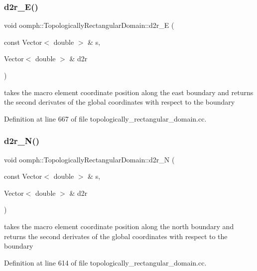 \subsubsection{\texorpdfstring{d2r\+\_\+\+E()}{d2r\_E()}}
{\footnotesize\ttfamily void oomph\+::\+Topologically\+Rectangular\+Domain\+::d2r\+\_\+E (\begin{DoxyParamCaption}\item[{const Vector$<$ double $>$ \&}]{s,  }\item[{Vector$<$ double $>$ \&}]{d2r }\end{DoxyParamCaption})\hspace{0.3cm}{\ttfamily [private]}}



takes the macro element coordinate position along the east boundary and returns the second derivates of the global coordinates with respect to the boundary 



Definition at line 667 of file topologically\+\_\+rectangular\+\_\+domain.\+cc.

\mbox{\label{classoomph_1_1TopologicallyRectangularDomain_a6cc86191b0085c8d7b3f05985cf647c8}} 
\subsubsection{\texorpdfstring{d2r\+\_\+\+N()}{d2r\_N()}}
{\footnotesize\ttfamily void oomph\+::\+Topologically\+Rectangular\+Domain\+::d2r\+\_\+N (\begin{DoxyParamCaption}\item[{const Vector$<$ double $>$ \&}]{s,  }\item[{Vector$<$ double $>$ \&}]{d2r }\end{DoxyParamCaption})\hspace{0.3cm}{\ttfamily [private]}}



takes the macro element coordinate position along the north boundary and returns the second derivates of the global coordinates with respect to the boundary 



Definition at line 614 of file topologically\+\_\+rectangular\+\_\+domain.\+cc.

